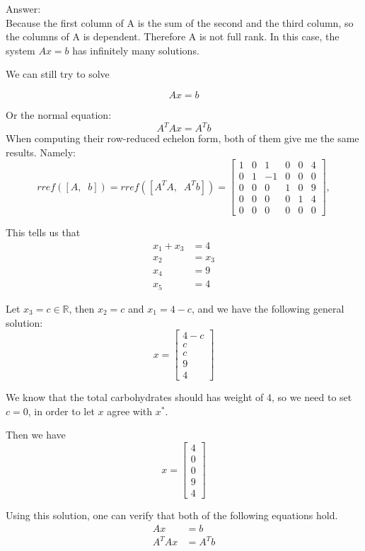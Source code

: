 \documentclass[paper=a4, fontsize=11pt]{scrartcl} %
\numberwithin{equation}{section} %
\numberwithin{figure}{section} %
\numberwithin{table}{section} %
\begin{document}
Answer: \\ 
Because the first column of A is the sum of the second and the third column, so the columns of A is dependent. Therefore A is not full rank. In this case, the system $Ax = b$ has infinitely many solutions. 

We can still try to solve 

$$
Ax = b
$$

Or the normal equation: 
$$
A^T A x = A^T b
$$
When computing their row-reduced echelon form, both of them give me the same results. Namely: 
$$
rref([A,\;\; b]) = rref([A^{T}A, \;\; A^T b]) = 
\begin{bmatrix}
     1&     0&     1&     0&     0&     4	\\
     0&     1&    -1&     0&     0&     0	\\
     0&     0&     0&     1&     0&     9	\\
     0&     0&     0&     0&     1&     4	\\
     0&     0&     0&     0&     0&     0
\end{bmatrix}, 
$$

This tells us that 
\begin{align*} 
x_1 + x_3 &=  4 \\ 
x_2 &= x_3 		\\
x_4 &= 9			\\
x_5 &= 4
\end{align*}

Let $x_3 = c \in \mathbb{R}$, then $x_2 = c$ and $x_1 = 4 - c$, and we have the following general solution: 
$$
x = 
\begin{bmatrix}
4-c	\\
c	\\
c	\\
9	\\
4
\end{bmatrix}
$$

We know that the total carbohydrates should has weight of 4, so we need to set $c = 0$, in order to let $x$ agree with $x^{*}$. 

Then we have 
$$
x = 
\begin{bmatrix}
4	\\
0	\\
0	\\
9	\\
4
\end{bmatrix}
$$

Using this solution, one can verify that both of the following equations hold. 
\begin{align*} 
Ax &= b \\ 
A^T A x &= A^T b
\end{align*}\\\\
\end{document}
